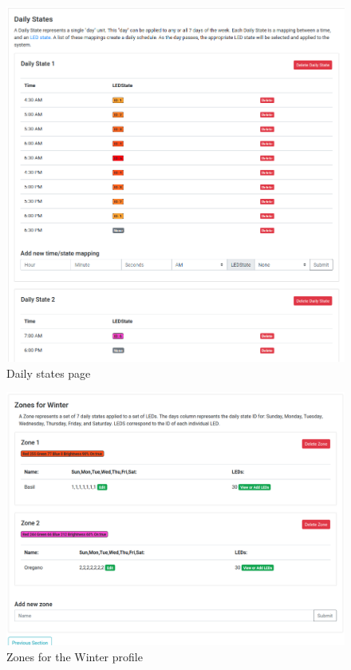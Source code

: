 \documentclass[onecolumn, draftclsnofoot,10pt, compsoc]{IEEEtran}
\begin{document}
		\begin{center}
			\begin{figure}[H]
				\includegraphics[width=\linewidth]{site/daily_states.png}
				\caption{Daily states page}
				\label{fig:siteDailyStates}
			\end{figure}
		\end{center}
		\begin{center}
			\begin{figure}[H]
				\includegraphics[width=\linewidth]{site/zones_winter.png}
				\caption{Zones for the Winter profile}
				\label{fig:siteZonesWinter}
			\end{figure}
		\end{center}
\end{document}
